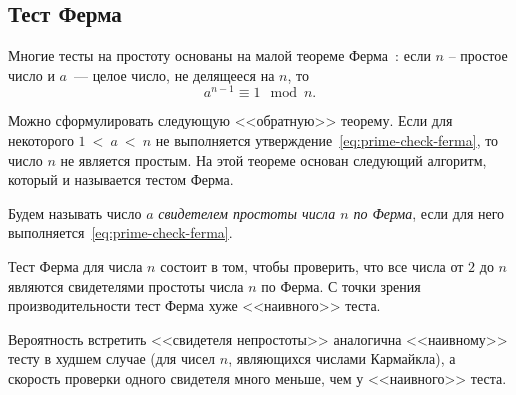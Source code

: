 \subsection{Тест Ферма}\label{section-prime-check-ferma}

Многие тесты на простоту основаны на малой теореме Ферма~\cite{Vinberg:2008}: если $n$ -- простое число и $a$~--- целое число, не делящееся на $n$, то
\begin{equation}\label{eq:prime-check-ferma}
    a^{n-1} \equiv 1 \mod n.
\end{equation}

Можно сформулировать следующую <<обратную>> теорему. Если для некоторого $1~<~a~<~n$ не выполняется утверждение~\ref{eq:prime-check-ferma}, то число $n$ не является простым. На этой теореме основан следующий алгоритм, который и называется тестом Ферма.

Будем называть число $a$ \emph{свидетелем простоты числа $n$ по Ферма}, если для него выполняется~\ref{eq:prime-check-ferma}.

Тест Ферма для числа $n$ состоит в том, чтобы проверить, что все числа от $2$ до $n$ являются свидетелями простоты числа $n$ по Ферма. С точки зрения производительности тест Ферма хуже <<наивного>> теста.

Вероятность встретить <<свидетеля непростоты>> аналогична <<наивному>> тесту в худшем случае (для чисел $n$, являющихся числами Кармайкла), а скорость проверки одного свидетеля много меньше, чем у <<наивного>> теста.
